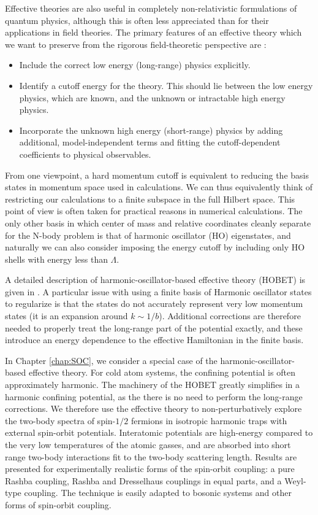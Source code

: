 Effective theories are also useful in completely non-relativistic formulations of quantum physics, although this is often less appreciated than for their applications in field theories. The primary features of an effective theory which we want to preserve from the rigorous field-theoretic perspective are \cite{Lepage:1997}:
\begin{itemize}
\item Include the correct low energy (long-range) physics explicitly. 
\item Identify a cutoff energy for the theory. This should lie between the low energy physics, which are known, and the unknown or intractable high energy physics. 
\item Incorporate the unknown high energy (short-range) physics by adding additional, model-independent terms and fitting the cutoff-dependent coefficients to physical observables.
\end{itemize}

From one viewpoint, a hard momentum cutoff is equivalent to reducing the basis states in momentum space used in calculations. We can thus equivalently think of restricting our calculations to a finite subspace in the full Hilbert space. This point of view is often taken for practical reasons in numerical calculations. The only other basis in which center of mass and relative coordinates cleanly separate for the N-body problem is that of harmonic oscillator (HO) eigenstates, and naturally we can also consider imposing the energy cutoff by including only HO shells with energy less than $\Lambda$. 

A detailed description of harmonic-oscillator-based effective theory (HOBET) is given in \cite{PhysRevC.77.034005}. A particular issue with using a finite basis of Harmonic oscillator states to regularize is that the states do not accurately represent very low momentum states (it is an expansion around $k\sim 1/b$). Additional corrections are therefore needed to properly treat the long-range part of the potential exactly, and these introduce an energy dependence to the effective Hamiltonian in the finite basis.

In Chapter \ref{chap:SOC}, we consider a special case of the harmonic-oscillator-based effective theory. For cold atom systems, the confining potential is often approximately harmonic. The machinery of the HOBET greatly simplifies in a harmonic confining potential, as the there is no need to perform the long-range corrections. We therefore use the effective theory to non-perturbatively explore the two-body spectra of spin-$1/2$ fermions in isotropic harmonic traps with external spin-orbit potentials. Interatomic potentials are high-energy compared to the very low temperatures of the atomic gasses, and are absorbed into short range two-body interactions fit to the two-body scattering length. Results are presented for experimentally realistic forms of the spin-orbit coupling: a pure Rashba coupling, Rashba and Dresselhaus couplings in equal parts, and a Weyl-type coupling. The technique is easily adapted to bosonic systems and other forms of spin-orbit coupling.